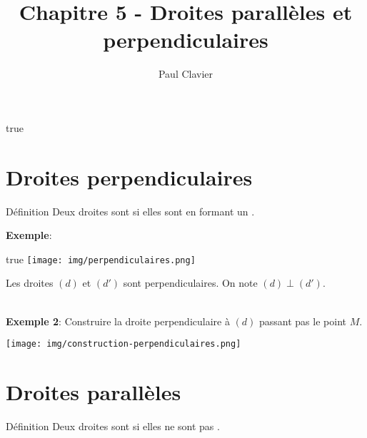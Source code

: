 \documentclass[12pt,a4paper]{article}
\author{Paul Clavier}
\title{Chapitre 5 - Droites parallèles et perpendiculaires}
\begin{document}
\renewcommand\thesection{\Roman{section}}
\renewcommand\thesubsection{\arabic{subsection}}

\def\isprof{true}

\ifdefined\isprof
	\TeacherModeOn
\fi




\begin{center}
\end{center}

\section{Droites perpendiculaires}

\begin{definition}{Définition}
Deux droites sont  si elles sont  en formant un .
\end{definition}

\textbf{Exemple}: \\
\begin{minipage}{0.5\textwidth}
\ifdefined\isprof
\texttt{[image: img/perpendiculaires.png]} 
\else
{}
\fi
\end{minipage}
\begin{minipage}{0.4\textwidth}
Les droites $(d)$ et $(d')$ sont perpendiculaires. On note $(d) \perp (d')$.
\end{minipage}\\

\textbf{Exemple 2}: Construire la droite perpendiculaire à $(d)$ passant pas le point $M$.

\texttt{[image: img/construction-perpendiculaires.png]} 

\section{Droites parallèles}

\begin{definition}{Définition}
Deux droites sont  si elles ne sont pas .
\end{definition}
\end{document}
